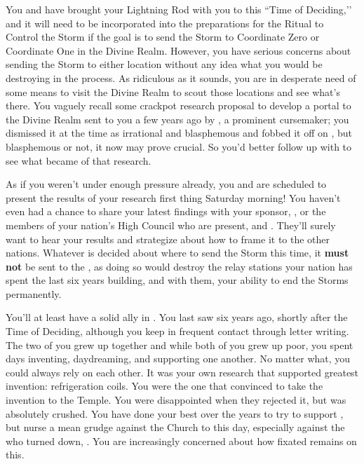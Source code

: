 \documentclass[char]{GL2020}
\begin{document}
You and \cAssistantScientist{} have brought your Lightning Rod with you to this ``Time of Deciding,’’ and it will need to be incorporated into the preparations for the Ritual to Control the Storm if the goal is to send the Storm to Coordinate Zero or Coordinate One in the Divine Realm. However, you have serious concerns about sending the Storm to either location without any idea what you would be destroying in the process. As ridiculous as it sounds, you are in desperate need of some means to visit the Divine Realm to scout those locations and see what's there. You vaguely recall some crackpot research proposal to develop a portal to the Divine Realm sent to you a few years ago by \cCurse{\full}, a prominent cursemaker; you dismissed it at the time as irrational and blasphemous and fobbed it off on \cAssistantScientist{}, but blasphemous or not, it now may prove crucial. So you’d better follow up with \cAssistantScientist{\them} to see what became of that research. 

As if you weren't under enough pressure already, you and \cAssistantScientist{} are scheduled to present the results of your research first thing Saturday morning! You haven't even had a chance to share your latest findings with your sponsor, \cDiplomat{\full}, or the members of your nation's High Council who are present, \cAntiChup{\full} and \cTechStar{\full}. They’ll surely want to hear your results and strategize about how to frame it to the other nations. Whatever is decided about where to send the Storm this time, it \textbf{must not} be sent to the \pTech{}, as doing so would destroy the relay stations your nation has spent the last six years building, and with them, your ability to end the Storms permanently.

You'll at least have a solid ally in \cChupInventor{\full}. You last saw \cChupInventor{\them} six years ago, shortly after the Time of Deciding, although you keep in frequent contact through letter writing. The two of you grew up together and while both of you grew up poor, you spent days inventing, daydreaming, and supporting one another. No matter what, you could always rely on each other. It was your own research that supported \cChupInventor{\their} greatest invention: refrigeration coils. You were the one that convinced \cChupInventor{} to take the invention to the Temple. You were disappointed when they rejected it, but \cChupInventor{} was absolutely crushed. You have done your best over the years to try to support \cChupInventor{}, but \cChupInventor{\they} nurse\cChupInventor{\verbs} a mean grudge against the Church to this day, especially against the \cAntiChup{\cleric} who turned \cChupInventor{\them} down, \cAntiChup{\full}. You are increasingly concerned about how fixated \cChupInventor{} remains on this.
\end{document}
